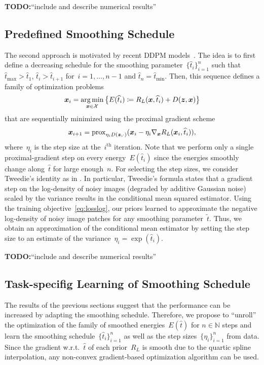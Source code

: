 \documentclass{article} %
\theoremstyle{plain}
\theoremstyle{definition}
\theoremstyle{remark}
\newcommand{\todo}[1]{{\color{red}\textbf{TODO:}``#1''}}
\newcommand{\N}{\mathbb{N}}
\newcommand{\X}{\mathcal{X}}
\newcommand{\prox}{\mathrm{prox}}
\def\hatt{{\widehat{t}}}
\newcommand{\tminh}{\hatt_\mathrm{min}}
\newcommand{\tmaxh}{\hatt_\mathrm{max}}
\begin{document}
\todo{include and describe numerical results}

\subsection{Predefined Smoothing Schedule}
The second approach is motivated by recent DDPM models~\citep{SoEr19,HoJa20}.
The idea is to first define a decreasing schedule for the smoothing parameter~$\{\widehat{t}_i\}_{i=1}^n$ such that~$\tmaxh>\widehat{t}_1$, $\widehat{t}_i>\widehat{t}_{i+1}$ for~$i=1,\ldots,n-1$ and $\widehat{t}_n=\tminh$.
Then, this sequence defines a family of optimization problems
\[
\vx_i =\argmin_{\vx\in\X} \left\{E(\widehat{t}_i)\coloneqq R_L(\vx,\widehat{t}_i)+D(\vz,\vx)\right\}
\]
that are sequentially minimized using the proximal gradient scheme~\citep{Be17}
\[
\vx_{i+1} = \prox_{\eta_iD(\vz,\cdot)}(\vx_i-\eta_i\nabla_\vx R_L(\vx_i,\widehat{t}_i)),
\]
where~$\eta_i$ is the step size at the~$i^\text{th}$ iteration.
Note that we perform only a single proximal-gradient step on every energy~$E(\widehat{t}_i)$ since the energies smoothly change along~$\widehat{t}$ for large enough~$n$.
For selecting the step sizes, we consider Tweedie's identity as in .
In particular, Tweedie's formula states that a gradient step on the log-density of noisy images (degraded by additive Gaussian noise) scaled by the variance results in the conditional mean squared estimator.
Using the training objective~\eqref{eq:losslog}, our priors learned to approximate the negative log-density of noisy image patches for any smoothing parameter~$\widetilde{t}$.
Thus, we obtain an approximation of the conditional mean estimator by setting the step size to an estimate of the variance~$\eta_i=\exp(\widehat{t}_i)$.

\todo{include and describe numerical results}



\subsection{Task-specifig Learning of Smoothing Schedule}
The results of the previous sections suggest that the performance can be increased by adapting the smoothing schedule.
Therefore, we propose to ``unroll'' the optimization of the family of smoothed energies~$E(\hatt)$ for $n\in\N$ steps and learn the smoothing schedule~$\{\hatt_i\}_{i=1}^n$ as well as the step sizes~$\{\eta_i\}_{i=1}^n$ from data.
Since the gradient w.r.t.~$\hatt$ of each prior~$R_L$ is smooth due to the quartic spline interpolation, any non-convex gradient-based optimization algorithm can be used.
\end{document}
